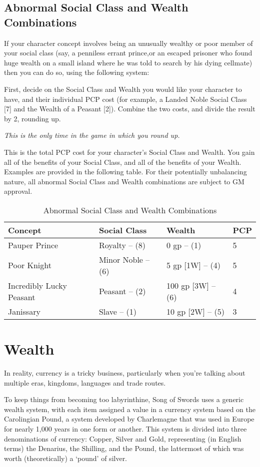 \documentclass[oneside,11pt,english]{book}
\begin{document}
\subsection{Abnormal Social Class and Wealth Combinations}
If your character concept involves being an unusually wealthy or poor member of your social class (say, a penniless errant prince,or an escaped prisoner who found huge wealth on a small island where he was told to search by his dying cellmate) then you can do so, using the following system:\par
First, decide on the Social Class and Wealth you would like your character to have, and their individual PCP cost (for example, a Landed Noble Social Class [7] and the Wealth of a Peasant [2]). Combine the two costs, and divide the result by 2, rounding up. 

\emph{This is the only time in the game in which you round up.}

This is the total PCP cost for your character’s Social Class and Wealth. You gain all of the benefits of your Social Class, and all of the benefits of your Wealth. Examples are provided in the following table. For their potentially unbalancing nature, all abnormal Social Class and Wealth combinations are subject to GM approval.

\begin{table}[ht]
	\centering
	\caption{Abnormal Social Class and Wealth Combinations}
	\label{tab;Abnormal Class/Wealth Combinations}
	\begin{tabu} spread 0pt {X[l]X[R]X[R]X[-1,c]}
Concept						&Social Class		&Wealth				&PCP \\\toprule
Pauper Prince				&Royalty -- (8)		&0 gp -- (1)		&5\\
Poor Knight					&Minor Noble -- (6)	&5 gp [1W] -- (4)	&5\\
Incredibly Lucky Peasant	&Peasant -- (2)		&100 gp [3W] -- (6)	&4\\
Janissary					&Slave -- (1)		&10 gp [2W] -- (5)	&3\\
	\end{tabu}
\end{table}

\section{Wealth}
In reality, currency is a tricky business, particularly when you're talking about multiple eras, kingdoms, 
languages and trade routes.

To keep things from becoming too labyrinthine, Song of Swords uses a generic wealth system, with each item assigned a value in a currency system based on the Carolingian Pound, a system developed by Charlemagne that was used in Europe for nearly 1,000 years in one form or another. This system is divided into three denominations of currency: Copper, Silver and Gold, representing (in English terms) the Denarius, the Shilling, and the Pound, the lattermost of which was worth (theoretically) a ‘pound’ of silver.
\end{document}
